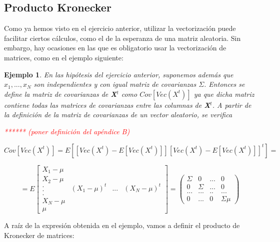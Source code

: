 \documentclass{article}
\theoremstyle{theorem-style}  %
\theoremstyle{definition-style}
\theoremstyle{example-style}
\newtheorem{example}{Ejemplo}[section]
\theoremstyle{exercise-style}
\begin{document}
	
	\subsection{Producto Kronecker}
	
	Como ya hemos visto en el ejercicio anterior, utilizar la vectorización puede facilitar ciertos cálculos, como el de la esperanza de una matriz aleatoria. Sin embargo, hay ocasiones en las que es obligatorio usar la vectorización de matrices, como en el ejemplo siguiente:
	
	\begin{example}
		En las hipótesis del ejercicio anterior, suponemos además que $x_1, ..., x_N$ son independientes y con igual matriz de covarianzas $\Sigma$. Entonces se define la matriz de covarianzas de \textbf{X}$^t$ como $Cov[Vec(X^t)]$ ya que dicha matriz contiene todas las matrices de covarianzas entre las columnas de \textbf{X}$^t$. A partir de la definición de la matriz de covarianzas de un vector aleatorio, se verifica
		
		\textcolor{red}{****** (poner definición del apéndice B)}
		
		$$Cov[Vec(X^t)] = E[[Vec(X^t)  - E[Vec(X^t)]] [Vec(X^t) - E[Vec(X^t)]]^t] = $$
		
		
		$$=E \left[{\begin{array}{c}
			X_1 - \mu\\
			X_2 - \mu\\
			.\\
			.\\
			.\\
			X_N - \mu\\
			\mu
			\end{array}}{\begin{array}{ccc}
			(X_1 - \mu)^t & ... &	(X_N- \mu)^t\\
			\end{array} }\right] =	 \left( {\begin{array}{cccc}
			\Sigma & 0 & ... & 0\\
			0 & \Sigma & ... & 0\\
			... & ... & .. & ... \\
			0 & ... & 0 & \Sigma\mu
			\end{array}}\right) $$
		
	\end{example}
	
	A raíz de la expresión obtenida en el ejemplo, vamos a definir el producto de Kronecker de matrices:
	
\end{document}
